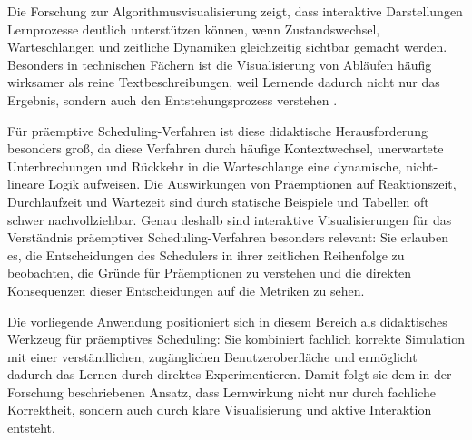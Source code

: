 Die Forschung zur Algorithmusvisualisierung zeigt, dass interaktive Darstellungen Lernprozesse deutlich unterstützen können, wenn Zustandswechsel, Warteschlangen und zeitliche Dynamiken gleichzeitig sichtbar gemacht werden. Besonders in technischen Fächern ist die Visualisierung von Abläufen häufig wirksamer als reine Textbeschreibungen, weil Lernende dadurch nicht nur das Ergebnis, sondern auch den Entstehungsprozess verstehen \cite{hundhausen2002meta,naps2002engagement,stasko1998software}. 

Für präemptive Scheduling-Verfahren ist diese didaktische Herausforderung besonders groß, da diese Verfahren durch häufige Kontextwechsel, unerwartete Unterbrechungen und Rückkehr in die Warteschlange eine dynamische, nicht-lineare Logik aufweisen. Die Auswirkungen von Präemptionen auf Reaktionszeit, Durchlaufzeit und Wartezeit sind durch statische Beispiele und Tabellen oft schwer nachvollziehbar. Genau deshalb sind interaktive Visualisierungen für das Verständnis präemptiver Scheduling-Verfahren besonders relevant: Sie erlauben es, die Entscheidungen des Schedulers in ihrer zeitlichen Reihenfolge zu beobachten, die Gründe für Präemptionen zu verstehen und die direkten Konsequenzen dieser Entscheidungen auf die Metriken zu sehen.

Die vorliegende Anwendung positioniert sich in diesem Bereich als didaktisches Werkzeug für präemptives Scheduling: Sie kombiniert fachlich korrekte Simulation mit einer verständlichen, zugänglichen Benutzeroberfläche und ermöglicht dadurch das Lernen durch direktes Experimentieren. Damit folgt sie dem in der Forschung beschriebenen Ansatz, dass Lernwirkung nicht nur durch fachliche Korrektheit, sondern auch durch klare Visualisierung und aktive Interaktion entsteht.
